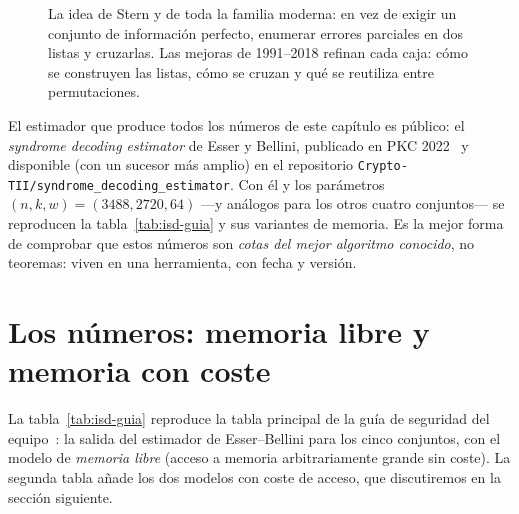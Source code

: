 \begin{figure}[htbp]
\centering
{}
\caption{La idea de Stern y de toda la familia moderna: en vez de
exigir un conjunto de información perfecto, enumerar errores
parciales en dos listas y cruzarlas. Las mejoras de 1991--2018
refinan cada caja: cómo se construyen las listas, cómo se cruzan y
qué se reutiliza entre permutaciones.}
\label{fig:isd-stern}
\end{figure}

\begin{practica}
El estimador que produce todos los números de este capítulo es
público: el \emph{syndrome decoding estimator} de Esser y Bellini,
publicado en PKC 2022~\cite{esserbellini2022} y disponible (con un
sucesor más amplio) en el repositorio
\texttt{Crypto-TII/syndrome\_decoding\_estimator}. Con él y los
parámetros $(n,k,w)=(3488,2720,64)$ ---y análogos para los otros
cuatro conjuntos--- se reproducen la tabla~\ref{tab:isd-guia} y sus
variantes de memoria. Es la mejor forma de comprobar que estos
números son \emph{cotas del mejor algoritmo conocido}, no teoremas:
viven en una herramienta, con fecha y versión.
\end{practica}

\section{Los números: memoria libre y memoria con coste}

La tabla~\ref{tab:isd-guia} reproduce la tabla principal de la guía de
seguridad del equipo~\cite{cmsecurity}: la salida del estimador de
Esser--Bellini para los cinco conjuntos, con el modelo de
\emph{memoria libre} (acceso a memoria arbitrariamente grande sin
coste). La segunda tabla añade los dos modelos con coste de acceso,
que discutiremos en la sección siguiente.

